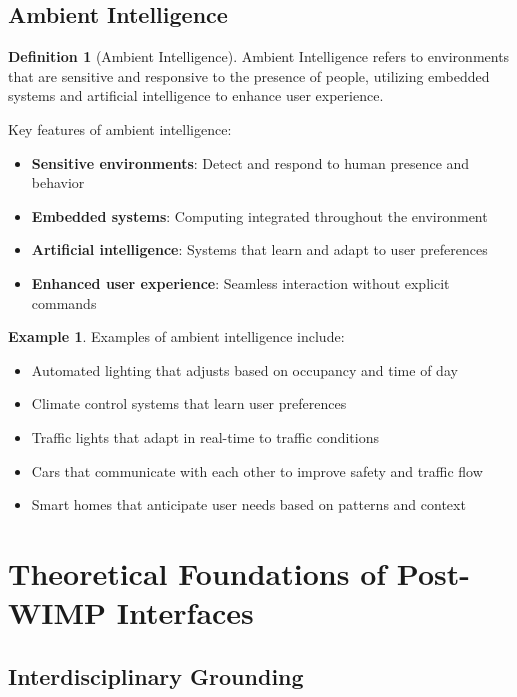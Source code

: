 \documentclass[11pt,a4paper]{article}
\theoremstyle{definition}
\newtheorem{definition}{Definition}[section]
\newtheorem{example}{Example}[section]
\theoremstyle{plain}
\theoremstyle{remark}
\begin{document}
\subsection{Ambient Intelligence}

\begin{definition}[Ambient Intelligence]
Ambient Intelligence refers to environments that are sensitive and responsive to the presence of people, utilizing embedded systems and artificial intelligence to enhance user experience.
\end{definition}

Key features of ambient intelligence:

\begin{itemize}
    \item \textbf{Sensitive environments}: Detect and respond to human presence and behavior
    \item \textbf{Embedded systems}: Computing integrated throughout the environment
    \item \textbf{Artificial intelligence}: Systems that learn and adapt to user preferences
    \item \textbf{Enhanced user experience}: Seamless interaction without explicit commands
\end{itemize}

\begin{example}
Examples of ambient intelligence include:
\begin{itemize}
    \item Automated lighting that adjusts based on occupancy and time of day
    \item Climate control systems that learn user preferences
    \item Traffic lights that adapt in real-time to traffic conditions
    \item Cars that communicate with each other to improve safety and traffic flow
    \item Smart homes that anticipate user needs based on patterns and context
\end{itemize}
\end{example}

\section{Theoretical Foundations of Post-WIMP Interfaces}

\subsection{Interdisciplinary Grounding}
\end{document}
